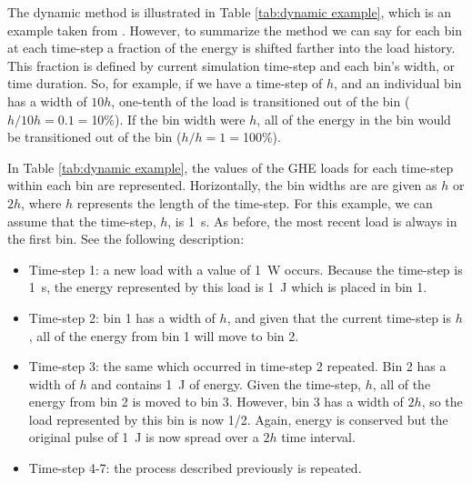 \documentclass[review,12pt]{elsarticle}
\begin{document}
The dynamic method is illustrated in Table \ref{tab:dynamic example}, which is an example taken from \cite{ClaessonJaved2012}. However, to summarize the method we can say for each bin at each time-step a fraction of the energy is shifted farther into the load history. This fraction is defined by current simulation time-step and each bin's width, or time duration. So, for example, if we have a time-step of $h$, and an individual bin has a width of $10h$, one-tenth of the load is transitioned out of the bin ($h/10h = 0.1 = $10\%). If the bin width were $h$, all of the energy in the bin would be transitioned out of the bin ($h/h = 1 = $100\%).

In Table \ref{tab:dynamic example}, the values of the GHE loads for each time-step within each bin are represented. Horizontally, the bin widths are are given as $h$ or $2h$, where $h$ represents the length of the time-step. For this example, we can assume that the time-step, $h$, is \SI{1}{\second}. As before, the most recent load is always in the first bin. See the following description:

\begin{itemize}
    \item Time-step 1: a new load with a value of \SI{1}{\watt} occurs. Because the time-step is \SI{1}{\second}, the energy represented by this load is \SI{1}{\joule} which is placed in bin 1.

    \item Time-step 2: bin 1 has a width of $h$, and given that the current time-step is $h$, all of the energy from bin 1 will move to bin 2.

    \item Time-step 3: the same which occurred in time-step 2 repeated. Bin 2 has a width of $h$ and contains \SI{1}{\joule} of energy.  Given the time-step, $h$, all of the energy from bin 2 is moved to bin 3.  However, bin 3 has a width of $2h$, so the load represented by this bin is now 1/2. Again, energy is conserved but the original pulse of \SI{1}{\joule} is now spread over a $2h$ time interval.

    \item Time-step 4-7: the process described previously is repeated.

\end{itemize}
\end{document}
